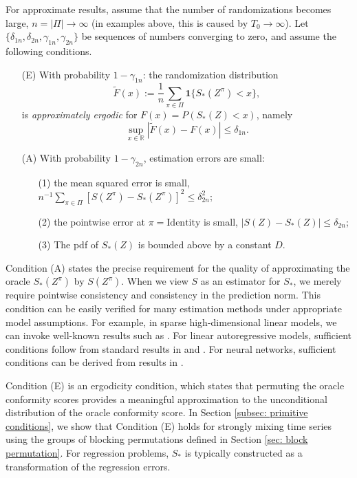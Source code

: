 \documentclass[final,12pt]{colt2018} %
\begin{document}
For approximate results, assume that
the number of randomizations
becomes large, $n = |\Pi|\rightarrow\infty$ (in examples above, this is caused by $T_0 \to \infty$). Let $\{\delta_{1n}, \delta_{2n}, \gamma_{1n}, \gamma_{2n}\}$ be sequences of numbers converging to zero, and assume the following conditions.
\begin{itemize} 
\item [(E)] With
probability $1-\gamma_{1n}$:  the randomization distribution 
$$\tilde{F}(x):=\frac{1}{n}\sum_{\pi\in\Pi}\mathbf{1}\{S_*(Z^\pi)< x\},$$
is \textit{approximately ergodic} for $F(x)=P\left(S_*(Z)< x\right)$, namely 
$$
\sup_{x\in\mathbb{R}}\left|\tilde{F}(x)-F\left(x\right)\right|\leq\delta_{1n}.
$$
\end{itemize}
\begin{itemize} 
\item [(A)] With
probability $1-\gamma_{2n}$, estimation errors are small:
\begin{itemize}
\item[(1)] the mean squared error is small, $n^{-1}\sum_{\pi\in\Pi}\left[S(Z^\pi)-S_*(Z^\pi)\right]^{2}\leq\delta_{2n}^{2};$ 
\item[(2)] the pointwise error at $\pi=\mathrm{Identity}$ is small, $|S(Z)-S_*(Z)|\leq\delta_{2n}$; 
\item[(3)] The pdf of $S_*(Z)$ is bounded above by a constant $D$. 
\end{itemize}
\end{itemize}

Condition (A) states the precise requirement for the quality of approximating the oracle $S_*(Z^\pi)$ by $S(Z^\pi) $. When we view $S$ as an estimator for $S_*$,  we merely require pointwise consistency and consistency in the prediction norm. This condition can be easily verified for many estimation methods under appropriate model assumptions. For example, in  sparse high-dimensional linear models, we can invoke well-known results such as \citet{bickel2009simultaneous}. For linear autoregressive models, sufficient conditions follow from standard results in \citet{hamilton1994time} and \citet{brockwell2013time}. For neural networks, sufficient conditions can be derived from results in \citet{chen1999improved}. 

Condition (E) is an ergodicity condition, which states that permuting the oracle conformity scores provides a meaningful approximation to the unconditional distribution of the oracle conformity score. In Section \ref{subsec: primitive conditions}, we show that Condition (E) holds for strongly mixing time series using the groups
of blocking permutations defined in Section \ref{sec: block permutation}. For regression problems,  $S_* $ is typically constructed as a transformation of the regression errors.  
\end{document}
